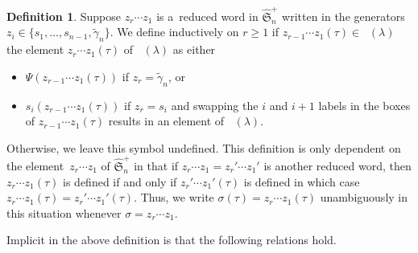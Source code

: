\documentclass[pdftex]{sigma}
\numberwithin{equation}{section}
\theoremstyle{definition}
\newtheorem{Definition}[Theorem]{Definition}
\DeclareMathOperator{\PSYT}{\mathrm{PSYT}_{\geq 0}}
\begin{document}
\begin{Definition}\label{action of extended affine permutations of PSYT}
 Suppose $z_r\cdots z_1$ is a~reduced word in $\widehat{\mathfrak{S}}_n^{+}$ written in the generators $z_i \in \{s_1,\dots, s_{n-1},\widetilde{\gamma}_n\}$. We define inductively on $r \geq 1$ if $z_{r-1}\cdots z_1(\tau) \in \PSYT(\lambda)$ the element $z_r\cdots z_1(\tau)$ of $\PSYT(\lambda)$ as either
 \begin{itemize}
\itemsep=0pt
 \item $\Psi(z_{r-1}\cdots z_1(\tau))$ if $z_r = \widetilde{\gamma}_n$, or
 \item $s_i(z_{r-1}\cdots z_1(\tau))$ if $z_r = s_i$ and swapping the $i$ and $i+1$ labels in the boxes of $z_{r-1}\cdots z_1(\tau)$ results in an element of $\PSYT(\lambda)$.
 \end{itemize}
 Otherwise, we leave this symbol undefined. This definition is only dependent on the element~${z_r\cdots z_1}$ of $\widehat{\mathfrak{S}}_n^{+}$ in that if $z_r\cdots z_1 = z_r'\cdots z_1'$ is another reduced word, then $z_r\cdots z_1(\tau)$ is defined if and only if $z_r'\cdots z_1'(\tau)$ is defined in which case $z_r\cdots z_1(\tau) = z_r'\cdots z_1'(\tau)$. Thus, we write $\sigma(\tau) = z_r\cdots z_1(\tau)$ unambiguously in this situation whenever $\sigma = z_r\cdots z_1$.
\end{Definition}

Implicit in the above definition is that the following relations hold.
\end{document}
